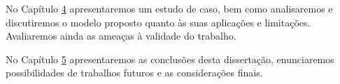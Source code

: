 No Capítulo \hyperref[Chapter:Results]{4} apresentaremos um estudo de caso, bem
como analisaremos e discutiremos o modelo proposto quanto às suas aplicações e
limitações.
Avaliaremos ainda as ameaças à validade do trabalho.

No Capítulo \hyperref[Chapter:Conclusion]{5} apresentaremos as conclusões desta
dissertação, enunciaremos possibilidades de trabalhos futuros e as considerações
finais.

